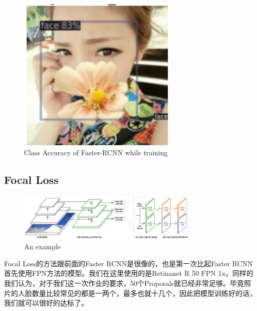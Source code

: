 \documentclass[journal,transmag]{IEEEtran}
\begin{document}
\begin{figure}[h]
\centering
\includegraphics[width=3in]{b.png}
\caption{Class Accuracy of Faster-RCNN while training}
\end{figure}

\subsection{Focal Loss}
\begin{figure}[h]
\centering
\includegraphics[width=3.44in]{c.bmp}
\caption{An example}
\end{figure}

Focal Loss的方法跟前面的Faster RCNN是很像的，也是第一次比起Faster RCNN首先使用FPN方法的模型。我们在这里使用的是Retinanet R 50 FPN 1x，同样的我们认为，对于我们这一次作业的要求，50个Proposals就已经非常足够。毕竟照片的人脸数量比较常见的都是一两个，最多也就十几个，因此把模型训练好的话，我们就可以很好的达标了。
\end{document}
